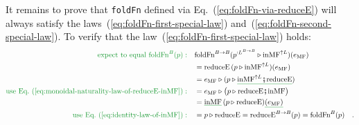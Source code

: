 It remains to prove that \lstinline!foldFn! defined via Eq.~(\ref{eq:foldFn-via-reduceE})
will always satisfy the laws~(\ref{eq:foldFn-first-special-law})
and~(\ref{eq:foldFn-second-special-law}). To verify that the law~(\ref{eq:foldFn-first-special-law})
holds:
\begin{align*}
{\color{greenunder}\text{expect to equal }\text{foldFn}^{B}(p):}\quad & \text{foldFn}^{B\rightarrow B}(p^{:L^{B\rightarrow B}}\triangleright\text{inMF}^{\uparrow L})(e_{\text{MF}})\\
 & =\text{reduceE}\,(p\triangleright\text{inMF}^{\uparrow L})(e_{\text{MF}})\\
 & =e_{\text{MF}}\triangleright(p\triangleright\gunderline{\text{inMF}^{\uparrow L}\bef\text{reduceE}})\\
{\color{greenunder}\text{use Eq.~(\ref{eq:monoidal-naturality-law-of-reduceE-inMF})}:}\quad & =e_{\text{MF}}\triangleright\big(p\triangleright\text{reduceE}\bef\text{inMF}\big)\\
 & =\gunderline{\text{inMF}}\,(p\triangleright\text{reduceE})\gunderline{(e_{\text{MF}})}\\
{\color{greenunder}\text{use Eq.~(\ref{eq:identity-law-of-inMF})}:}\quad & =p\triangleright\text{reduceE}=\text{reduceE}^{B\rightarrow B}(p)=\text{foldFn}^{B}(p)\quad.
\end{align*}


